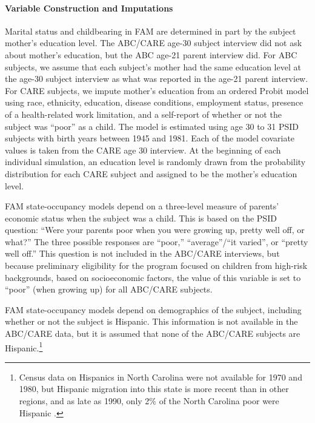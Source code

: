 \paragraph{Variable Construction and Imputations}
\label{section:FAM_ABC_impute}


\noindent Marital status and childbearing in FAM are determined in part by the subject mother's education level. The ABC/CARE age-30 subject interview did not ask about mother's education, but the ABC age-21 parent interview did.
For ABC subjects, we assume that each subject's mother had the same education level at the age-30 subject interview as what was reported in the age-21 parent interview. For CARE subjects, we impute mother's education from an ordered Probit model using race, ethnicity, education, disease conditions, employment status, presence of a health-related work limitation, and a self-report of whether or not the subject was ``poor'' as a child.  The model is estimated using age 30 to 31 PSID subjects with birth years between 1945 and 1981. Each of the model covariate values is taken from the CARE age 30 interview. At the beginning of each individual simulation, an education level is randomly drawn from the probability distribution for each CARE subject and assigned to be the mother's education level.

\noindent FAM state-occupancy models depend on a three-level measure of parents' economic status when the subject was a child.
This is based on the PSID question: ``Were your parents poor when you were growing up, pretty well off, or what?''
The three possible responses are ``poor,'' ``average''/``it varied'', or ``pretty well off.''
This question is not included in the ABC/CARE interviews, but because preliminary eligibility for the program focused on children from high-risk backgrounds, based on socioeconomic factors, the value of this variable is set to ``poor'' (when growing up) for all ABC/CARE subjects.

\noindent FAM state-occupancy models depend on demographics of the subject, including whether or not the subject is Hispanic.
This information is not available in the ABC/CARE data, but it is assumed that none of the ABC/CARE subjects are Hispanic.\footnote{Census data on Hispanics in North Carolina were not available for 1970 and 1980, but Hispanic migration into this state is more recent than in other regions, and as late as 1990, only 2\% of the North Carolina poor were Hispanic \citep{Johnson_2003_Changing-Poverty}.}

